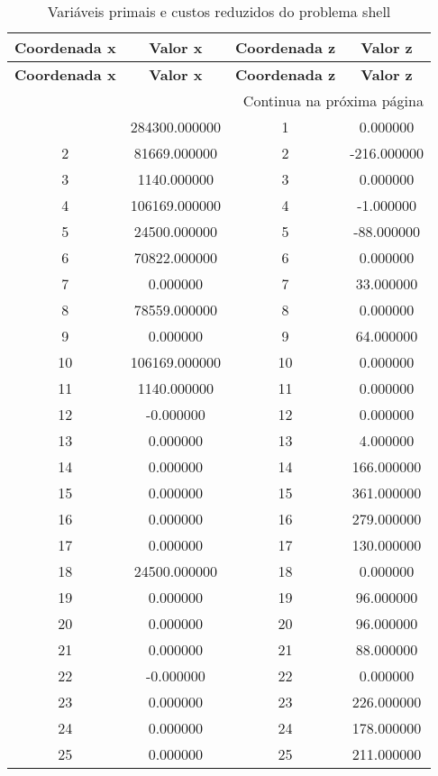 \documentclass[12pt]{article}
\begin{document}
\begin{longtable}{@{}cccc@{}}
\caption{Variáveis primais e custos reduzidos do problema shell} \\
\toprule
\textbf{Coordenada x} & \textbf{Valor x} & \textbf{Coordenada z} & \textbf{Valor z} \\
\midrule
\endfirsthead

\toprule
\textbf{Coordenada x} & \textbf{Valor x} & \textbf{Coordenada z} & \textbf{Valor z} \\
\midrule
\endhead

\midrule \multicolumn{4}{r}{{Continua na próxima página}} \\ \midrule
\endfoot

\bottomrule
\endlastfoot
1 & 284300.000000 & 1 & 0.000000 \\
2 & 81669.000000 & 2 & -216.000000 \\
3 & 1140.000000 & 3 & 0.000000 \\
4 & 106169.000000 & 4 & -1.000000 \\
5 & 24500.000000 & 5 & -88.000000 \\
6 & 70822.000000 & 6 & 0.000000 \\
7 & 0.000000 & 7 & 33.000000 \\
8 & 78559.000000 & 8 & 0.000000 \\
9 & 0.000000 & 9 & 64.000000 \\
10 & 106169.000000 & 10 & 0.000000 \\
11 & 1140.000000 & 11 & 0.000000 \\
12 & -0.000000 & 12 & 0.000000 \\
13 & 0.000000 & 13 & 4.000000 \\
14 & 0.000000 & 14 & 166.000000 \\
15 & 0.000000 & 15 & 361.000000 \\
16 & 0.000000 & 16 & 279.000000 \\
17 & 0.000000 & 17 & 130.000000 \\
18 & 24500.000000 & 18 & 0.000000 \\
19 & 0.000000 & 19 & 96.000000 \\
20 & 0.000000 & 20 & 96.000000 \\
21 & 0.000000 & 21 & 88.000000 \\
22 & -0.000000 & 22 & 0.000000 \\
23 & 0.000000 & 23 & 226.000000 \\
24 & 0.000000 & 24 & 178.000000 \\
25 & 0.000000 & 25 & 211.000000 \\

\end{longtable}
\end{document}
